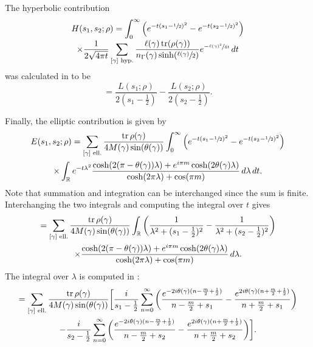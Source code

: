 \documentclass[JEP,XML,SOM,Unicode,NoFloatCountersInSection,published]{cedram}
\theoremstyle{plain}
\theoremstyle{definition}
\theoremstyle{remark}
\newcommand{\R}{\mathbb{R}}
\DeclareMathOperator{\tr}{tr}
\numberwithin{equation}{section}
\begin{document}
The hyperbolic contribution\vspace*{-3pt}
\begin{multline*}
H(s_1,s_2;\rho) = \int_0^\infty\left(e^{-t(s_1-\sfrac{1}{2})^2}-e^{-t(s_2-\sfrac{1}{2})^2}\right)\\[-3pt]
\times\frac{1}{2\sqrt{4\pi t}}\sum_{[\gamma]\textup{ hyp.}}\frac{\ell(\gamma)\tr(\rho(\gamma))}{n_{\Gamma}(\gamma)\sinh(\sfrac{\ell(\gamma)}{2})}e^{-\sfrac{\ell(\gamma)^2}{4t}}\,dt
\end{multline*}
was calculated in \cite[Prop.\,4.2.4 \& 4.2.5]{FS} to be\vspace*{-3pt}
\[
= \frac{L(s_1;\rho)}{2(s_1-\frac{1}{2})}-\frac{L(s_2;\rho)}{2(s_2-\frac{1}{2})}.
\]

Finally, the elliptic contribution is given by\vspace*{-3pt}
\begin{multline*}
E(s_1,s_2;\rho) = \sum_{[\gamma]\textup{ ell.}} \frac{\tr\rho(\gamma)}{4M(\gamma)\sin(\theta(\gamma))}\int_0^\infty\left(e^{-t(s_1-\sfrac{1}{2})^2}-e^{-t(s_2-\sfrac{1}{2})^2}\right)\\
\times\int_\R e^{-t\lambda^2}\frac{\cosh(2(\pi-\theta(\gamma))\lambda)+e^{i\pi m}\cosh(2\theta(\gamma)\lambda)}{\cosh(2\pi\lambda)+\cos(\pi m)}\,d\lambda\,dt.
\end{multline*}
Note that summation and integration can be interchanged since the sum is finite. Interchanging the two integrals and computing the integral over $t$ gives\vspace*{-3pt}
\begin{multline*}
= \sum_{[\gamma]\textup{ ell.}} \frac{\tr\rho(\gamma)}{4M(\gamma)\sin(\theta(\gamma))}\int_\R\left(\frac{1}{\lambda^2+(s_1-\frac{1}{2})^2}-\frac{1}{\lambda^2+(s_2-\frac{1}{2})^2}\right)\\
\times\frac{\cosh(2(\pi-\theta(\gamma))\lambda)+e^{i\pi m}\cosh(2\theta(\gamma)\lambda)}{\cosh(2\pi\lambda)+\cos(\pi m)}\,d\lambda.
\end{multline*}
The integral over $\lambda$ is computed in \cite[Ch.\,10, Lem.\,2.7]{He2}:\vspace*{-3pt}
\begin{multline}
= \sum_{[\gamma]\textup{ ell.}} \frac{\tr\rho(\gamma)}{4M(\gamma)\sin(\theta(\gamma))}\bigg[\frac{i}{s_1-\frac{1}{2}}\sum_{n=0}^\infty\bigg(\frac{e^{-2i\theta(\gamma)(n-\frac{m}{2}+\frac{1}{2})}}{n-\frac{m}{2}+s_1}-\frac{e^{2i\theta(\gamma)(n+\frac{m}{2}+\frac{1}{2})}}{n+\frac{m}{2}+s_1}\bigg)\\
-\frac{i}{s_2-\frac{1}{2}}\sum_{n=0}^\infty\bigg(\frac{e^{-2i\theta(\gamma)(n-\frac{m}{2}+\frac{1}{2})}}{n-\frac{m}{2}+s_2}-\frac{e^{2i\theta(\gamma)(n+\frac{m}{2}+\frac{1}{2})}}{n+\frac{m}{2}+s_2}\bigg)\bigg].\label{eq:EllipticFinal}
\end{multline}
\end{document}
